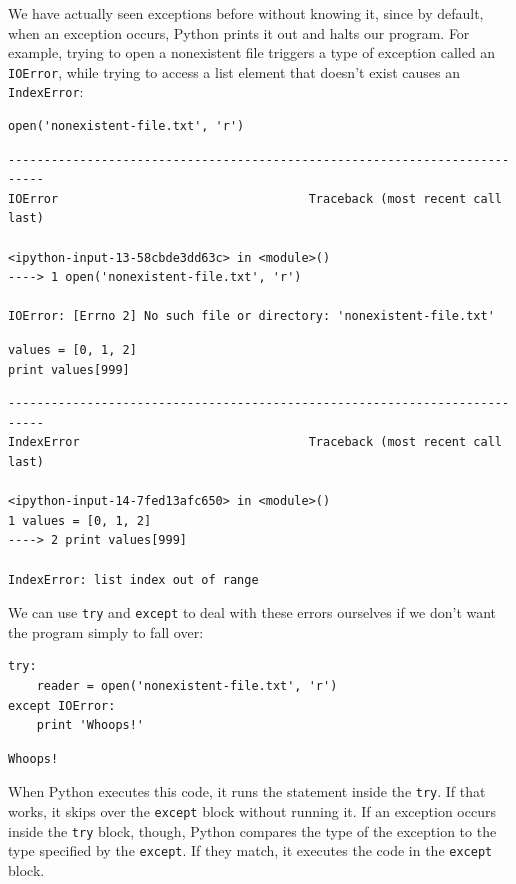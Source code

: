 \documentclass{book}
\begin{document}
We have actually seen exceptions before without knowing it, since by
default, when an exception occurs, Python prints it out and halts our
program. For example, trying to open a nonexistent file triggers a type
of exception called an \texttt{IOError}, while trying to access a list
element that doesn't exist causes an \texttt{IndexError}:

\begin{verbatim}
open('nonexistent-file.txt', 'r')
\end{verbatim}

\begin{verbatim}
---------------------------------------------------------------------------
IOError                                   Traceback (most recent call last)

<ipython-input-13-58cbde3dd63c> in <module>()
----> 1 open('nonexistent-file.txt', 'r')

IOError: [Errno 2] No such file or directory: 'nonexistent-file.txt'
\end{verbatim}

\begin{verbatim}
values = [0, 1, 2]
print values[999]
\end{verbatim}

\begin{verbatim}
---------------------------------------------------------------------------
IndexError                                Traceback (most recent call last)

<ipython-input-14-7fed13afc650> in <module>()
1 values = [0, 1, 2]
----> 2 print values[999]

IndexError: list index out of range
\end{verbatim}

We can use \texttt{try} and \texttt{except} to deal with these errors
ourselves if we don't want the program simply to fall over:

\begin{verbatim}
try:
    reader = open('nonexistent-file.txt', 'r')
except IOError:
    print 'Whoops!'
\end{verbatim}

\begin{verbatim}
Whoops!
\end{verbatim}

When Python executes this code, it runs the statement inside the
\texttt{try}. If that works, it skips over the \texttt{except} block
without running it. If an exception occurs inside the \texttt{try}
block, though, Python compares the type of the exception to the type
specified by the \texttt{except}. If they match, it executes the code in
the \texttt{except} block.
\end{document}
